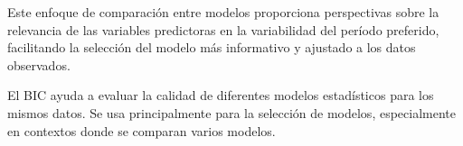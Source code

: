 Este enfoque de comparación entre modelos proporciona perspectivas sobre la relevancia de las variables predictoras en la variabilidad del período preferido, facilitando la selección del modelo más informativo y ajustado a los datos observados.

El BIC ayuda a evaluar la calidad de diferentes modelos estadísticos para los mismos datos. Se usa principalmente para la selección de modelos, especialmente en contextos donde se comparan varios modelos.





